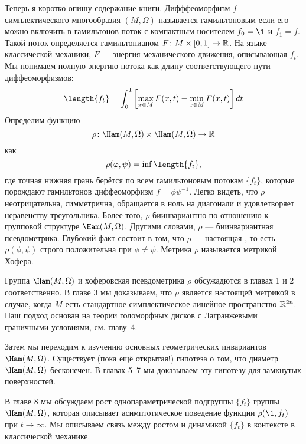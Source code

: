 Теперь я коротко опишу содержание книги.
Дифффеоморфизм $f$ симплектического многообразия $(M,\Omega)$
называется гамильтоновым если его можно включить в гамильтонов поток
 с компактным носителем   $f_0=\1$ и $f_1 =f$.
Такой поток определяется гамильтонианом $F\colon M \times [0, 1] \to \mathbb{R}$.
На языке классической механики, $F$ --- энергия механического движения, описывающая $f_t$.
Мы понимаем полную энергию потока как длину соответствующего пути диффеоморфизмов:
\[\length \{f_t\} =
\int_0^1\left[\max_{x\in M}F(x,t)-\min_{x\in M}F(x,t)\right] dt 
\]%
Определим функцию
\[\rho\: \Ham(M,\Omega) \times \Ham(M,\Omega) \to \RR\]
как
\[\rho (\phi, \psi) = \inf \length \{f_t\},\]
где точная нижняя грань берётся по всем гамильтоновым потокам $\{f_t\}$, которые
порождают гамильтонов диффеоморфизм $f = \phi\psi^{-1}$.
Легко видеть, что $\rho$ неотрицательна, симметрична, обращается в ноль на диагонали и удовлетворяет неравенству треугольника.
Более того, $\rho$ биинвариантно по отношению к групповой структуре  $\Ham(M,\Omega)$.
Другими словами, $\rho$ --- биинвариантная псевдометрика.
Глубокий факт состоит в том, что $\rho$ --- настоящая , то есть $\rho (\phi, \psi)$ строго положительна при $\phi \ne \psi$.
Метрика $\rho$ называется метрикой Хофера.

Группа $\Ham(M,\Omega)$ и хоферовская псевдометрика $\rho$ обсужадются в главах 1 и 2 соответственно.
В главе 3 мы доказываем, что $\rho$ является настоящей метрикой в случае, когда $M$ есть стандартное симплектическое линейное пространство $\mathbb{R}^{2n}$.
Наш подход основан на теории  голоморфных дисков  с Лагранжевыми граничными условиями, см.
главу~4.

Затем мы переходим к изучению основных геометрических инвариантов $\Ham(M,\Omega)$.
Существует (пока ещё открытая!) гипотеза о том, что диаметр $\Ham(M,\Omega)$ бесконечен.
В главах 5--7 мы доказываем эту гипотезу для замкнутых поверхностей.

В главе 8 мы обсуждаем рост однопараметрической подгруппы $\{f_t\}$ группы $\Ham(M,\Omega)$, которая описывает асимптотическое поведение функции $\rho (\1, f_t)$ при $t \to \infty$.
Мы описываем связь между ростом и динамикой $\{f_t\}$ в контексте
 в классической механике.

